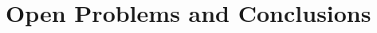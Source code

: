 \documentclass[11pt,a4paper]{article}
\theoremstyle{plain}
\theoremstyle{definition}
\theoremstyle{remark}
\begin{document}
\section{Open Problems and Conclusions}\label{sec:open}
\end{document}
